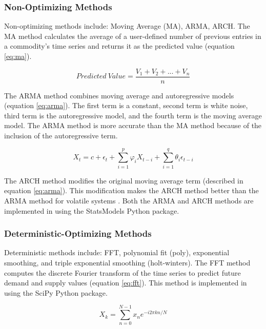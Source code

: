 \subsubsection{Non-Optimizing Methods}
Non-optimizing methods include: Moving Average (MA), \gls{ARMA}, 
\gls{ARCH}. 
The MA method calculates the average of 
a user-defined number of previous entries in a commodity's 
time series and returns it as the predicted value 
(equation \ref{eq:ma}).

\begin{equation}
	\label{eq:ma}
	Predicted\ Value = \frac{V_1+V_2+...+V_n}{n}
\end{equation}

The \gls{ARMA} method combines moving average and
autoregressive models (equation \ref{eq:arma}).
The first term is a constant, second term is 
white noise, third term is the autoregressive
model, and the fourth term is the moving average
model.
The \gls{ARMA} method is more accurate than the MA method 
because of the inclusion of the autoregressive term. 

\begin{equation}
	\label{eq:arma}
	X_t = c + \epsilon_t + 
	\sum_{i=1}^p\varphi_i X_{t-i} +	
	\sum_{i=1}^q\theta_i\epsilon_{t-i}
\end{equation}

The \gls{ARCH} method modifies the original moving 
average term (described in equation \ref{eq:arma}). 
This modification makes the \gls{ARCH} method 
better than the \gls{ARMA} method for volatile systems
\cite{flanagan_methods_2019}. 
Both the \gls{ARMA} and \gls{ARCH} methods are 
implemented in \deploy using the StatsModels 
\cite{github_community_statsmodels:_2019}
Python package. 

\subsubsection{Deterministic-Optimizing Methods}
Deterministic methods include: \gls{FFT}, polynomial fit
(poly), 
exponential smoothing, and triple exponential smoothing 
(holt-winters). 
The FFT method computes the discrete Fourier transform 
of the time series to predict future demand and supply 
values (equation \ref{eq:fft}).
This method is implemented in \deploy using the 
SciPy \cite{jones_scipy:_2016} Python package. 

\begin{equation}
	\label{eq:fft}
	X_k = \sum_{n=0}^{N-1}x_n e^{-i2\pi kn/N}
\end{equation}


